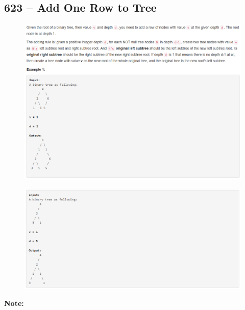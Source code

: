 \documentclass[a4paper,12pt]{article}
\begin{document}
\subsection{623 -- Add One Row to Tree}
\begin{figure}[H]
	\begin{center}
		\includegraphics[width=18cm]{623_1.png}
	\end{center}
\end{figure}
\begin{figure}[H]
	\begin{center}
		\includegraphics[width=18cm]{623_2.png}
	\end{center}
\end{figure}
\textbf{\large{Note:}}
\par
\vspace{0.5em}
\end{document}
